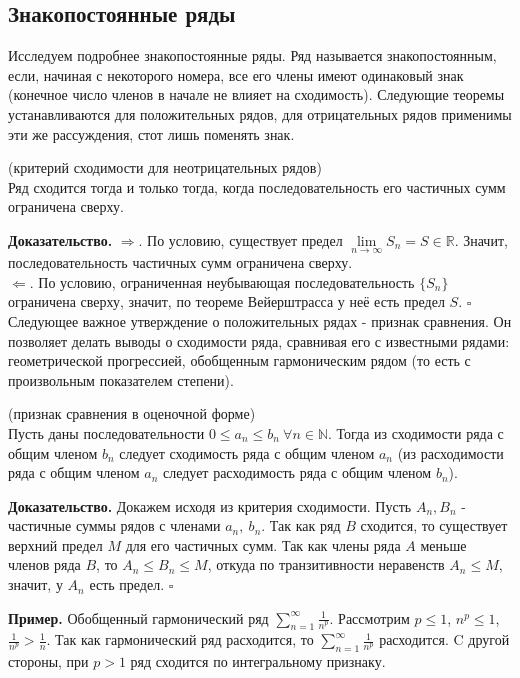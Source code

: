 \subsection{Знакопостоянные ряды}
Исследуем подробнее знакопостоянные ряды. Ряд называется знакопостоянным,
если, начиная с некоторого номера, все его члены имеют одинаковый знак
(конечное число членов в начале не влияет на сходимость). Следующие теоремы 
устанавливаются для положительных рядов, для отрицательных рядов применимы
эти же рассуждения, стот лишь поменять знак.
\begin{theor}
    (критерий сходимости для неотрицательных рядов)\\
    Ряд сходится тогда и только тогда, когда последовательность его
    частичных сумм ограничена сверху.
\end{theor}
\textbf{Доказательство.}
$\Rightarrow$. По условию, существует предел 
$\lim\limits_{n \to \infty} S_n=S\in \mathbb{R}$. Значит, последовательность 
частичных сумм ограничена сверху.\\
$\Leftarrow$. По условию, ограниченная неубывающая последовательность 
$\{S_n\}$ ограничена сверху, значит, по теореме
Вейерштрасса у неё есть предел  $S$. $\square$\\
Следующее важное утверждение о положительных рядах - признак сравнения. Он
позволяет делать выводы о сходимости ряда, сравнивая его с известными рядами:
геометрической прогрессией, обобщенным гармоническим рядом (то есть с 
произвольным показателем степени). 
\begin{theor}
    (признак сравнения в оценочной форме)\\
    Пусть даны последовательности
    $0\leqslant a_n\leqslant b_n~\forall n\in\mathbb{N}$. 
    Тогда из сходимости ряда с общим членом $b_n$ следует сходимость ряда с 
    общим членом $a_n$ (из расходимости ряда с общим членом $a_n$ следует
    расходимость ряда с общим членом $b_n$).
\end{theor}
\textbf{Доказательство.}  Докажем исходя из критерия сходимости.
Пусть $A_n,B_n$ - частичные суммы рядов с членами $a_n,~b_n$.
Так как ряд $B$ сходится, то существует верхний предел $M$ для его частичных 
сумм.
Так как члены ряда $A$ меньше членов ряда $B$, то 
$A_n\leqslant B_n\leqslant M$, откуда по транзитивности неравенств 
$A_n\leqslant M$, значит, у $A_n$ есть предел. $\square$

\textbf{Пример.} Обобщенный гармонический ряд
$\sum\limits_{n=1}^{\infty} \frac{1}{n^p}$.
Рассмотрим $p\leqslant 1$,  $n^p\leqslant 1$,
$\frac{1}{n^p}>\frac{1}{n}$. Так как 
гармонический ряд расходится, то $\sum\limits_{n=1}^{\infty}\frac{1}{n^p}$
расходится. C другой стороны, при $p>1$ ряд сходится по интегральному 
признаку. 

